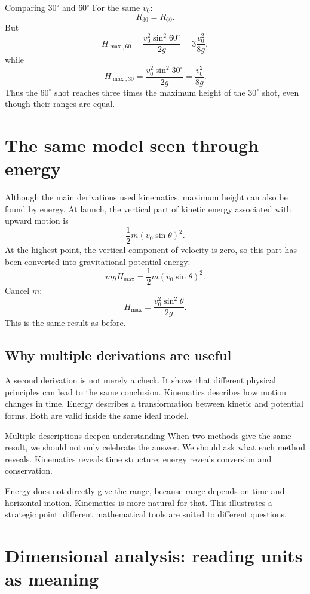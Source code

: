 \documentclass[11pt,a4paper]{article}
\begin{document}
\begin{examplebox}{Comparing $30^\circ$ and $60^\circ$}
For the same $v_0$:
\[
R_{30}=R_{60}.
\]
But
\[
H_{\max,60}=\frac{v_0^2\sin^2 60^\circ}{2g}
=3\frac{v_0^2}{8g},
\]
while
\[
H_{\max,30}=\frac{v_0^2\sin^2 30^\circ}{2g}
=\frac{v_0^2}{8g}.
\]
Thus the $60^\circ$ shot reaches three times the maximum height of the $30^\circ$ shot, even though their ranges are equal.
\end{examplebox}

\newpage

\section{The same model seen through energy}

Although the main derivations used kinematics, maximum height can also be found by energy. At launch, the vertical part of kinetic energy associated with upward motion is
\[
\frac12m(v_0\sin\theta)^2.
\]
At the highest point, the vertical component of velocity is zero, so this part has been converted into gravitational potential energy:
\[
mgH_{\max}=\frac12m(v_0\sin\theta)^2.
\]
Cancel $m$:
\[
H_{\max}=\frac{v_0^2\sin^2\theta}{2g}.
\]
This is the same result as before.

\subsection{Why multiple derivations are useful}

A second derivation is not merely a check. It shows that different physical principles can lead to the same conclusion. Kinematics describes how motion changes in time. Energy describes a transformation between kinetic and potential forms. Both are valid inside the same ideal model.

\begin{principlebox}{Multiple descriptions deepen understanding}
When two methods give the same result, we should not only celebrate the answer. We should ask what each method reveals. Kinematics reveals time structure; energy reveals conversion and conservation.
\end{principlebox}

Energy does not directly give the range, because range depends on time and horizontal motion. Kinematics is more natural for that. This illustrates a strategic point: different mathematical tools are suited to different questions.

\section{Dimensional analysis: reading units as meaning}
\end{document}
